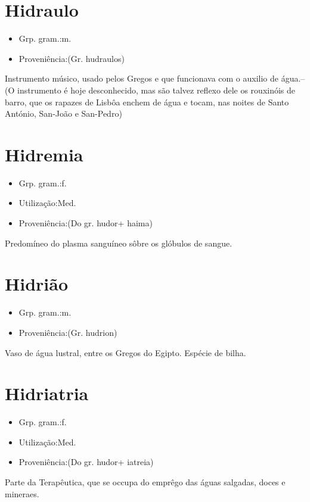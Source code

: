 \documentclass{article}
\begin{document}
\section{Hidraulo}
\begin{itemize}
\item {Grp. gram.:m.}
\end{itemize}
\begin{itemize}
\item {Proveniência:(Gr. \textunderscore hudraulos\textunderscore )}
\end{itemize}
Instrumento músico, usado pelos Gregos e que funcionava com o auxilio de água.--(O instrumento é hoje desconhecido, mas são talvez reflexo dele os \textunderscore rouxinóis de barro\textunderscore , que os rapazes de Lisbôa enchem de água e tocam, nas noites de Santo António, San-João e San-Pedro)
\section{Hidremia}
\begin{itemize}
\item {Grp. gram.:f.}
\end{itemize}
\begin{itemize}
\item {Utilização:Med.}
\end{itemize}
\begin{itemize}
\item {Proveniência:(Do gr. \textunderscore hudor\textunderscore  + \textunderscore haima\textunderscore )}
\end{itemize}
Predomíneo do plasma sanguíneo sôbre os glóbulos de sangue.
\section{Hidrião}
\begin{itemize}
\item {Grp. gram.:m.}
\end{itemize}
\begin{itemize}
\item {Proveniência:(Gr. \textunderscore hudrion\textunderscore )}
\end{itemize}
Vaso de água lustral, entre os Gregos do Egipto.
Espécie de bilha.
\section{Hidriatria}
\begin{itemize}
\item {Grp. gram.:f.}
\end{itemize}
\begin{itemize}
\item {Utilização:Med.}
\end{itemize}
\begin{itemize}
\item {Proveniência:(Do gr. \textunderscore hudor\textunderscore  + \textunderscore iatreia\textunderscore )}
\end{itemize}
Parte da Terapêutica, que se occupa do emprêgo das águas salgadas, doces e mineraes.
\end{document}
